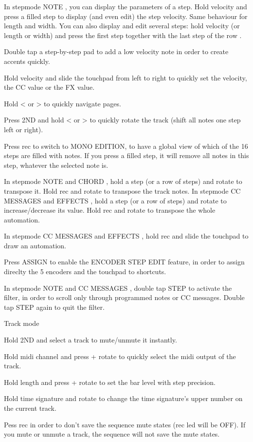 In stepmode  NOTE , you can display the parameters of a step. Hold velocity and press a filled step to display (and even edit) the step velocity. Same behaviour for length and width. You can also display and edit several steps: hold velocity (or length or width) and press the first step together with the last step of the row .

Double tap a step-by-step pad  to add a low velocity note in order to create accents quickly.

Hold velocity and slide the touchpad from left to right to quickly set the velocity, the CC value or the FX value.

Hold  <  or  >  to quickly navigate pages.

Press  2ND  and hold  <  or  >  to quickly rotate the track (shift all notes one step left or right).

Press rec  to switch to MONO EDITION, to have a global view of which of the 16 steps are filled with notes. If you press a filled step, it will remove all notes in this step, whatever the selected note is.

In stepmode  NOTE  and  CHORD , hold a step   (or a row of steps) and rotate   to transpose it. Hold rec and rotate   to transpose the track notes.
In stepmode  CC MESSAGES  and  EFFECTS , hold a step  (or a row of steps) and rotate  to increase/decrease its value. Hold rec  and rotate  to transpose the whole automation.

In stepmode  CC MESSAGES  and  EFFECTS , hold rec and slide the touchpad to draw an automation.

Press ASSIGN to enable the ENCODER STEP EDIT feature, in order to assign direclty the 5 encoders and the touchpad to shortcuts.

In stepmode  NOTE  and  CC MESSAGES , double tap STEP to activate the filter, in order to scroll only through programmed notes or CC messages. Double tap STEP again to quit the filter.

Track mode

Hold  2ND  and select a track  to mute/unmute it instantly.

Hold midi channel and press + rotate  to quickly select the midi output of the track.

Hold length and press + rotate  to set the bar level with step precision.

Hold time signature and rotate  to change the time signature's upper number on the current track.

Pess rec   in order to don't save the sequence mute states (rec led will be OFF). If you mute or unmute a track, the sequence will not save the mute states.

